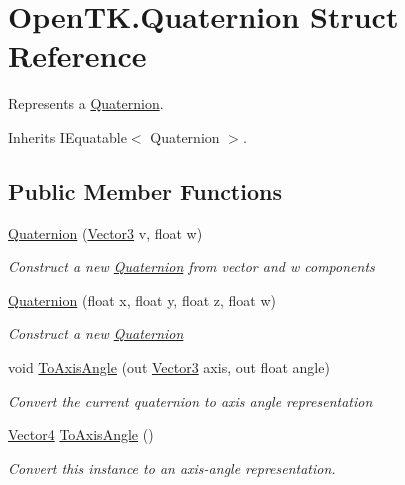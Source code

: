 \hypertarget{struct_open_t_k_1_1_quaternion}{\section{Open\-T\-K.\-Quaternion Struct Reference}
\label{struct_open_t_k_1_1_quaternion}
}


Represents a \hyperlink{struct_open_t_k_1_1_quaternion}{Quaternion}.  




Inherits I\-Equatable$<$ Quaternion $>$.

\subsection*{Public Member Functions}
\begin{DoxyCompactItemize}
\item 
\hyperlink{struct_open_t_k_1_1_quaternion_a06f0e188f9174175b591389fc4bbf0a1}{Quaternion} (\hyperlink{struct_open_t_k_1_1_vector3}{Vector3} v, float w)
\begin{DoxyCompactList}\small\item\em Construct a new \hyperlink{struct_open_t_k_1_1_quaternion}{Quaternion} from vector and w components \end{DoxyCompactList}\item 
\hyperlink{struct_open_t_k_1_1_quaternion_a903587c421dde735c08bf0bf878daf1f}{Quaternion} (float x, float y, float z, float w)
\begin{DoxyCompactList}\small\item\em Construct a new \hyperlink{struct_open_t_k_1_1_quaternion}{Quaternion} \end{DoxyCompactList}\item 
void \hyperlink{struct_open_t_k_1_1_quaternion_aefdf2ce49edd34247ee47da47ea340e5}{To\-Axis\-Angle} (out \hyperlink{struct_open_t_k_1_1_vector3}{Vector3} axis, out float angle)
\begin{DoxyCompactList}\small\item\em Convert the current quaternion to axis angle representation \end{DoxyCompactList}\item 
\hyperlink{struct_open_t_k_1_1_vector4}{Vector4} \hyperlink{struct_open_t_k_1_1_quaternion_a9473c428ba8e986cbf56b28d729a8cd3}{To\-Axis\-Angle} ()
\begin{DoxyCompactList}\small\item\em Convert this instance to an axis-\/angle representation. \end{DoxyCompactList}\item 

\end{DoxyCompactItemize}
